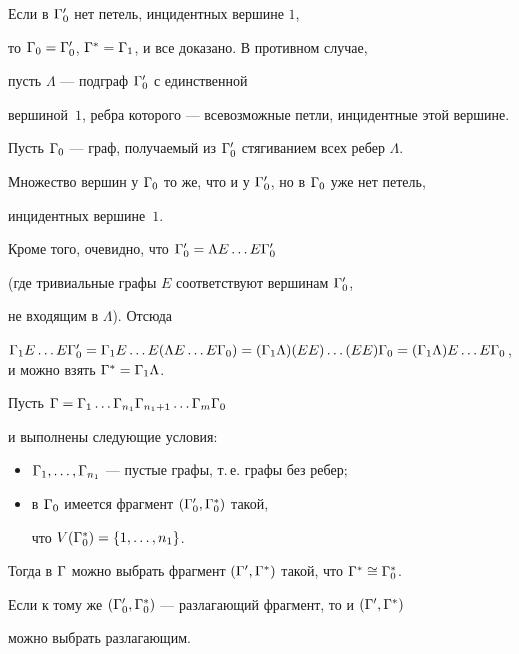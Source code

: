 \begin{pf}


Если в ${\Gamma}'_0$ нет петель, инцидентных вершине $1$, 


то ${\Gamma}_0={\Gamma}'_0$, ${\Gamma}^*={\Gamma}_1$, и все доказано. В противном случае, 


пусть $\Lambda $ --- подграф ${\Gamma}'_0$ с единственной 


вершиной~$1$, ребра которого --- всевозможные петли, инцидентные этой вершине.





Пусть ${\Gamma}_0$ --- граф, получаемый из ${\Gamma}'_0$ стягиванием всех ребер $\Lambda$.


Множество вершин у ${\Gamma}_0$ то же, что и у ${\Gamma}'_0$, но в ${\Gamma}_0$ уже нет петель,


инцидентных вершине~$1$. 


Кроме того, очевидно, что ${\Gamma}'_0=\Lambda E\dotsc E{\Gamma}'_0$


(где тривиальные графы $E$ соответствуют вершинам ${\Gamma}'_0$, 


не входящим в $\Lambda $). Отсюда


$\G_1E\dotsc E\G'_0=\G_1E\dotsc E(\Lambda E\dotsc E\G_0)=


(\G_1\Lambda )(EE)\dotsc (EE)\G_0=


(\G_1\Lambda )E\dotsc E\G_0$, и можно взять $\G^*=\G_1\Lambda $.


\end{pf}





\begin{lem}


Пусть ${\Gamma}={\Gamma}_1\dotsc {\Gamma}_{n_1}{\Gamma}_{n_1+1}\dotsc {\Gamma}_m{\Gamma}_0$ 


и выполнены следующие условия\/${:}$


\begin{itemize}


\item[a)]


${\Gamma}_1, \dotsc ,{\Gamma}_{n_1}$ --- пустые графы, т.\,е. графы без ребер$;$


\item[b)] в ${\Gamma}_0$ имеется фрагмент $({\Gamma}'_0, {\Gamma}^*_0)$ такой, 


что $V({\Gamma}^*_0)=\{ 1, \dotsc , n_1\}$.


\end{itemize}


Тогда в ${\Gamma}$ можно выбрать фрагмент $({\Gamma}', {\Gamma}^*)$ такой, что ${\Gamma}^*\cong{\Gamma}^*_0$.





Если к тому же $({\Gamma}'_0, {\Gamma}^*_0)$ --- разлагающий фрагмент, то и $({\Gamma}', {\Gamma}^*)$


можно выбрать разлагающим.


\end{lem}  





